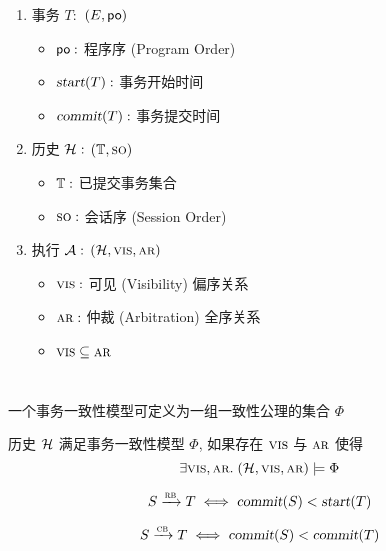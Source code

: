 
\begin{frame}{}
  \begin{columns}
	  \begin{enumerate}
	  	\setlength{\itemsep}{12pt}
	  	\item 事务 $T:$ $(E, {\sf po})$
	  	  \begin{itemize}
	  	    \setlength{\itemsep}{2pt}
	  	    \item ${\sf po}:$ 程序序 (Program Order)
	  	    \item $\textsl{start}(T):$ 事务开始时间
	  	    \item $\textsl{commit}(T):$ 事务提交时间
	  	  \end{itemize}
	  	\item 历史 $\mathcal{H}:$ $(\mathbb{T}, \textsc{so})$
	  	  \begin{itemize}
	  	    \setlength{\itemsep}{2pt}
			\item $\mathbb{T}:$ 已提交事务集合
	  	  	\item $\textsc{so}:$ 会话序 (Session Order)
	  	  \end{itemize}
	  	\item 执行 $\mathcal{A}:$ $(\mathcal{H}, \textsc{vis}, \textsc{ar})$
	  	  \begin{itemize}
	  	  	\setlength{\itemsep}{2pt}
	  	  	\item $\textsc{vis}:$ 可见 (Visibility) 偏序关系
	  	  	\item $\textsc{ar}:$ 仲裁 (Arbitration) 全序关系
	  	  	\item $\textsc{vis} \subseteq \textsc{ar}$
	  	  \end{itemize}
	  \end{enumerate}
  \end{columns}
\end{frame}

\begin{frame}{}
  \begin{center}
	一个事务一致性模型可定义为一组一致性公理的集合 $\Phi$

	\vspace{0.80cm}
	历史 $\mathcal{H}$ 满足事务一致性模型 $\Phi$,
	如果存在 $\textsc{vis}$ 与 $\textsc{ar}$ 使得
	\[
	  \exists \textsc{vis}, \textsc{ar}.\; (\mathcal{H}, \textsc{vis}, \textsc{ar}) \models \Phi
	\]
  \end{center}
\end{frame}

\begin{frame}{}
  

  \vspace{0.30cm}
  \[
	S \xrightarrow{\textsc{rb}} T \iff \textsl{commit}(S) < \textsl{start}(T)
  \]

  \[
	S \xrightarrow{\textsc{cb}} T \iff \textsl{commit}(S) < \textsl{commit}(T)
  \]
\end{frame}

